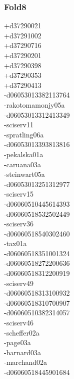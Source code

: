 \begin{multicols}{4}
\subsubsection*{Fold8}
+d37290021\\
+d37291002\\
+d37290716\\
+d37290201\\
+d37290398\\
+d37290353\\
+d37290413\\
-d06053013382113764\\
-rakotomamonjy05a\\
-d06053013312413349\\
-sciserv11\\
-spratling06a\\
-d06053013393813816\\
-pekalska01a\\
-caruana03a\\
-steinwart05a\\
-d06053013251312977\\
-sciserv15\\
-d06060510445614393\\
-d06060518532502449\\
-sciserv36\\
-d06060518540302460\\
-tax01a\\
-d06060518351001324\\
-d06060518272200636\\
-d06060518312200919\\
-sciserv49\\
-d06060518313100932\\
-d06060518310700907\\
-d06060510382314057\\
-sciserv46\\
-scheffer02a\\
-page03a\\
-barnard03a\\
-marchand02a\\
-d06060518445901684\\

\end{multicols}
